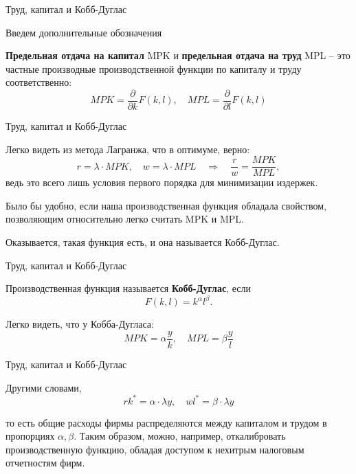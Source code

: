 \documentclass{beamer}
\begin{document}
\begin{frame}{Труд, капитал и Кобб-Дуглас}

Введем дополнительные обозначения

\begin{definition}
\textbf{Предельная отдача на капитал} MPK и \textbf{предельная отдача на труд} MPL – это частные производные производственной функции по капиталу и труду соответственно:
$$MPK = \frac{\partial}{\partial k}F(k,l), \quad MPL = \frac{\partial}{\partial l}F(k,l)$$
\end{definition}

\end{frame}

\begin{frame}{Труд, капитал и Кобб-Дуглас}

Легко видеть из метода Лагранжа, что в оптимуме, верно:
$$ r = \lambda \cdot MPK, \quad w = \lambda \cdot MPL \quad \Rightarrow \quad \frac{r}{w} = \frac{MPK}{MPL},$$
ведь это всего лишь условия первого порядка для минимизации издержек.

Было бы удобно, если наша производственная функция обладала свойством, позволяющим относительно легко считать MPK и MPL. 

Оказывается, такая функция есть, и она называется Кобб-Дуглас.

\end{frame}

\begin{frame}{Труд, капитал и Кобб-Дуглас}

\begin{definition}
Производственная функция называется \textbf{Кобб-Дуглас}, если 
$$ F(k,l) = k^{\alpha} l^{\beta}.$$
\end{definition}

Легко видеть, что у Кобба-Дугласа:
$$ MPK = \alpha \frac{y}{k}, \quad  MPL = \beta \frac{y}{l}$$

\end{frame}

\begin{frame}{Труд, капитал и Кобб-Дуглас}

Другими словами,
$$ r k^{\ast} = \alpha \cdot \lambda y, \quad w l^{\ast} = \beta \cdot \lambda y$$

то есть общие расходы фирмы распределяются между капиталом и трудом в пропорциях $\alpha, \beta$. Таким образом, можно, например, откалибровать производственную функцию, обладая доступом к нехитрым налоговым отчетностям фирм.

\end{frame}
\end{document}
